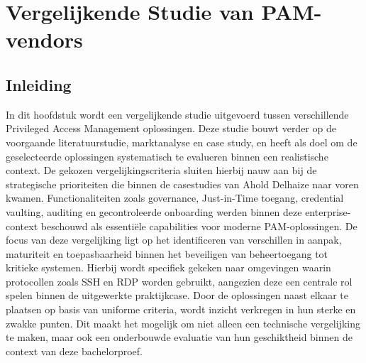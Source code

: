 \chapter{Vergelijkende Studie van PAM-vendors}
\label{ch:vergelijkende-Studie}
\section{Inleiding}
In dit hoofdstuk wordt een vergelijkende studie uitgevoerd tussen verschillende Privileged Access Management oplossingen. Deze studie bouwt verder op de voorgaande literatuurstudie, marktanalyse en case study, en heeft als doel om de geselecteerde oplossingen systematisch te evalueren binnen een realistische context.
De gekozen vergelijkingscriteria sluiten hierbij nauw aan bij de strategische prioriteiten die binnen de casestudies van Ahold Delhaize naar voren kwamen. Functionaliteiten zoals governance, Just-in-Time toegang, credential vaulting, auditing en gecontroleerde onboarding werden binnen deze enterprise-context beschouwd als essentiële capabilities voor moderne PAM-oplossingen.
De focus van deze vergelijking ligt op het identificeren van verschillen in aanpak, maturiteit en toepasbaarheid binnen het beveiligen van beheertoegang tot kritieke systemen. Hierbij wordt specifiek gekeken naar omgevingen waarin protocollen zoals SSH en RDP worden gebruikt, aangezien deze een centrale rol spelen binnen de uitgewerkte praktijkcase. 
Door de oplossingen naast elkaar te plaatsen op basis van uniforme criteria, wordt inzicht verkregen in hun sterke en zwakke punten. Dit maakt het mogelijk om niet alleen een technische vergelijking te maken, maar ook een onderbouwde evaluatie van hun geschiktheid binnen de context van deze bachelorproef.

